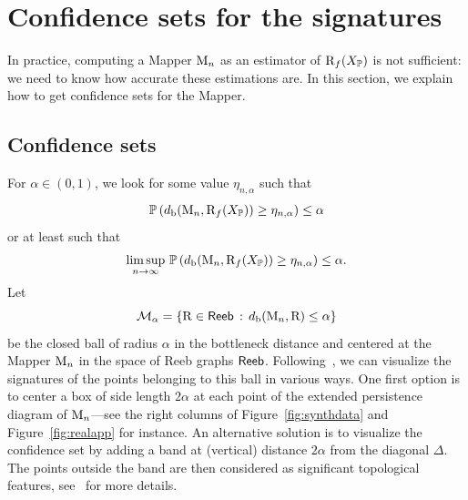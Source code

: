 
\section{Confidence sets for the signatures} \label{sec:confR}

In practice,  computing a Mapper $\mathrm{M}_n$ %
as an estimator of $\mathrm{R}_f(X_{\mathbb{P}})$ is not sufficient: we need to know how accurate these estimations are. 
In this section, we explain how to get confidence sets for the Mapper. 

\subsection{Confidence sets}\label{sec:confPD}

For $\alpha \in (0,1)$, we look for some value $\eta_{n,\alpha}$ such that
 $$ \mathbb{P}\left(d_{\rm b}(\mathrm{M}_n,\mathrm{R}_f(X_{\mathbb{P}}))\geq \eta_{n,\alpha} \right) \leq  \alpha $$
or at least such that 
$$\underset{n\rightarrow\infty}{\limsup}\ \proba{\dper(\Map_n,\Reeb_f(\Xset_\p))\geq \eta_{n,\alpha}}\leq\alpha.$$
Let $$\mathcal M_\alpha = \left\{ \mathrm{R}  \in {\sf Reeb}  \, : \,  d_{\rm b}(\mathrm{M}_n, \mathrm{R} )  \leq \alpha  \right\}$$ 
be the closed ball of radius $\alpha$ in the bottleneck distance and centered at the Mapper $\mathrm{M}_n$ in the space of Reeb graphs ${\sf Reeb}$. 
Following~\cite{Fasy14}, we can visualize the signatures of the points belonging to this ball in various ways. 
One first option is to center a box of side length $2\alpha$ at each point of the extended persistence diagram 
of $\mathrm{M}_n$---see the right columns of Figure~\ref{fig:synthdata} and Figure~\ref{fig:realapp} for instance. 
An alternative solution is to visualize the confidence set by adding a band at (vertical) distance $2\alpha$ %
from the diagonal $\Delta$.
The points outside the band are then considered as significant topological features, see~\cite{Fasy14} for more details.  
 
